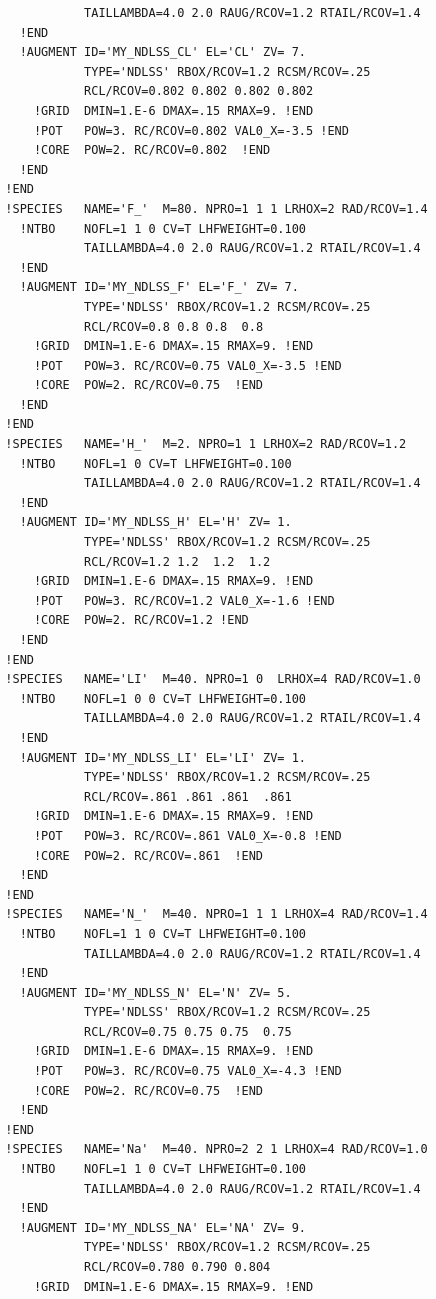 \documentclass{book}
\begin{document}
{\begin{verbatim}
             TAILLAMBDA=4.0 2.0 RAUG/RCOV=1.2 RTAIL/RCOV=1.4 
    !END 
    !AUGMENT ID='MY_NDLSS_CL' EL='CL' ZV= 7.
             TYPE='NDLSS' RBOX/RCOV=1.2 RCSM/RCOV=.25
             RCL/RCOV=0.802 0.802 0.802 0.802 
      !GRID  DMIN=1.E-6 DMAX=.15 RMAX=9. !END
      !POT   POW=3. RC/RCOV=0.802 VAL0_X=-3.5 !END
      !CORE  POW=2. RC/RCOV=0.802  !END
    !END
  !END
  !SPECIES   NAME='F_'  M=80. NPRO=1 1 1 LRHOX=2 RAD/RCOV=1.4
    !NTBO    NOFL=1 1 0 CV=T LHFWEIGHT=0.100
             TAILLAMBDA=4.0 2.0 RAUG/RCOV=1.2 RTAIL/RCOV=1.4 
    !END 
    !AUGMENT ID='MY_NDLSS_F' EL='F_' ZV= 7.
             TYPE='NDLSS' RBOX/RCOV=1.2 RCSM/RCOV=.25
             RCL/RCOV=0.8 0.8 0.8  0.8 
      !GRID  DMIN=1.E-6 DMAX=.15 RMAX=9. !END
      !POT   POW=3. RC/RCOV=0.75 VAL0_X=-3.5 !END
      !CORE  POW=2. RC/RCOV=0.75  !END
    !END
  !END
  !SPECIES   NAME='H_'  M=2. NPRO=1 1 LRHOX=2 RAD/RCOV=1.2
    !NTBO    NOFL=1 0 CV=T LHFWEIGHT=0.100
             TAILLAMBDA=4.0 2.0 RAUG/RCOV=1.2 RTAIL/RCOV=1.4 
    !END 
    !AUGMENT ID='MY_NDLSS_H' EL='H' ZV= 1.
             TYPE='NDLSS' RBOX/RCOV=1.2 RCSM/RCOV=.25
             RCL/RCOV=1.2 1.2  1.2  1.2 
      !GRID  DMIN=1.E-6 DMAX=.15 RMAX=9. !END
      !POT   POW=3. RC/RCOV=1.2 VAL0_X=-1.6 !END
      !CORE  POW=2. RC/RCOV=1.2 !END
    !END
  !END
  !SPECIES   NAME='LI'  M=40. NPRO=1 0  LRHOX=4 RAD/RCOV=1.0
    !NTBO    NOFL=1 0 0 CV=T LHFWEIGHT=0.100
             TAILLAMBDA=4.0 2.0 RAUG/RCOV=1.2 RTAIL/RCOV=1.4 
    !END 
    !AUGMENT ID='MY_NDLSS_LI' EL='LI' ZV= 1.
             TYPE='NDLSS' RBOX/RCOV=1.2 RCSM/RCOV=.25
             RCL/RCOV=.861 .861 .861  .861 
      !GRID  DMIN=1.E-6 DMAX=.15 RMAX=9. !END
      !POT   POW=3. RC/RCOV=.861 VAL0_X=-0.8 !END
      !CORE  POW=2. RC/RCOV=.861  !END
    !END
  !END
  !SPECIES   NAME='N_'  M=40. NPRO=1 1 1 LRHOX=4 RAD/RCOV=1.4
    !NTBO    NOFL=1 1 0 CV=T LHFWEIGHT=0.100
             TAILLAMBDA=4.0 2.0 RAUG/RCOV=1.2 RTAIL/RCOV=1.4 
    !END 
    !AUGMENT ID='MY_NDLSS_N' EL='N' ZV= 5.
             TYPE='NDLSS' RBOX/RCOV=1.2 RCSM/RCOV=.25
             RCL/RCOV=0.75 0.75 0.75  0.75
      !GRID  DMIN=1.E-6 DMAX=.15 RMAX=9. !END
      !POT   POW=3. RC/RCOV=0.75 VAL0_X=-4.3 !END
      !CORE  POW=2. RC/RCOV=0.75  !END
    !END
  !END
  !SPECIES   NAME='Na'  M=40. NPRO=2 2 1 LRHOX=4 RAD/RCOV=1.0
    !NTBO    NOFL=1 1 0 CV=T LHFWEIGHT=0.100
             TAILLAMBDA=4.0 2.0 RAUG/RCOV=1.2 RTAIL/RCOV=1.4 
    !END 
    !AUGMENT ID='MY_NDLSS_NA' EL='NA' ZV= 9.
             TYPE='NDLSS' RBOX/RCOV=1.2 RCSM/RCOV=.25
             RCL/RCOV=0.780 0.790 0.804
      !GRID  DMIN=1.E-6 DMAX=.15 RMAX=9. !END

\end{verbatim}}
\end{document}
